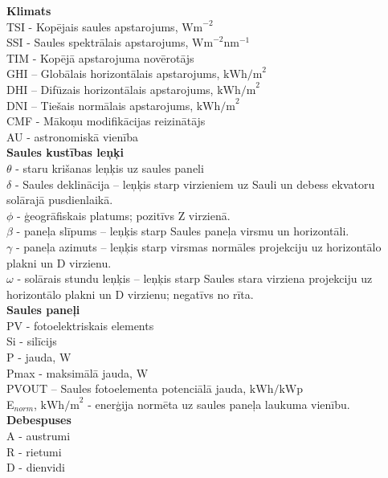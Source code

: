 \noindent 
\textbf{Klimats}\\
TSI - Kopējais saules apstarojums, $\textrm{Wm}^{-2}$\\
SSI - Saules spektrālais apstarojums, $\textrm{Wm}^{-2}\textrm{nm}^{-1}$\\
TIM - Kopējā apstarojuma novērotājs\\
GHI – Globālais horizontālais apstarojums,  $\textrm{kWh/m}^2$\\ %
DHI – Difūzais horizontālais apstarojums,  $\textrm{kWh/m}^2$\\ 
DNI – Tiešais normālais apstarojums, $\textrm{kWh/m}^2$\\ %
CMF - Mākoņu modifikācijas reizinātājs\\
AU - astronomiskā vienība\\  %
\textbf{Saules kustības leņķi}\\
$\theta$ - staru krišanas leņķis uz saules paneli\\
$\delta$ - Saules deklinācija -- leņķis starp virzieniem uz Sauli un debess ekvatoru solārajā pusdienlaikā.\\
 $\phi$  - ģeogrāfiskais platums; pozitīvs Z virzienā.\\
$\beta$  - paneļa slīpums -- leņķis starp Saules paneļa virsmu un horizontāli.\\
$\gamma$ - paneļa azimuts -- leņķis starp virsmas normāles projekciju uz horizontālo  plakni un D virzienu.\\
$\omega$ - solārais stundu leņķis -- leņķis starp Saules stara virziena projekciju uz horizontālo plakni un D virzienu; negatīvs no rīta.\\
\textbf{Saules paneļi}\\
PV - fotoelektriskais elements\\ %
Si - silīcijs\\
P - jauda, 	W\\
Pmax - maksimālā jauda, W\\
PVOUT – Saules fotoelementa potenciālā jauda, $\textrm{kWh/kWp}$\\ 
E$_{norm}$, $\textrm{kWh/m}^2$ - enerģija normēta uz saules paneļa laukuma vienību.\\
\textbf{Debespuses}\\
A - austrumi\\
R - rietumi\\
D - dienvidi\\